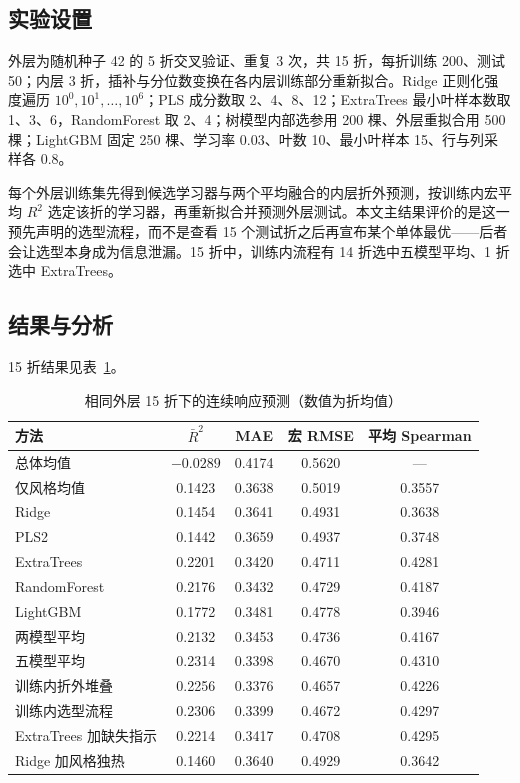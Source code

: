 \documentclass[UTF8,a4paper,zihao=-4]{ctexart}
\numberwithin{figure}{section}
\numberwithin{table}{section}
\numberwithin{equation}{section}
\begin{document}
\subsection{实验设置}

外层为随机种子 42 的 5 折交叉验证、重复 3 次，共 15 折，每折训练 200、测试 50；内层 3 折，插补与分位数变换在各内层训练部分重新拟合。Ridge 正则化强度遍历 $10^{0},10^{1},\dots,10^{6}$；PLS 成分数取 2、4、8、12；ExtraTrees 最小叶样本数取 1、3、6，RandomForest 取 2、4；树模型内部选参用 200 棵、外层重拟合用 500 棵；LightGBM 固定 250 棵、学习率 0.03、叶数 10、最小叶样本 15、行与列采样各 0.8。

每个外层训练集先得到候选学习器与两个平均融合的内层折外预测，按训练内宏平均 $R^2$ 选定该折的学习器，再重新拟合并预测外层测试。本文主结果评价的是这一预先声明的选型流程，而不是查看 15 个测试折之后再宣布某个单体最优——后者会让选型本身成为信息泄漏。15 折中，训练内流程有 14 折选中五模型平均、1 折选中 ExtraTrees。

\subsection{结果与分析}

15 折结果见表~\ref{tab:q1-results}。

\begin{table}[H]
  \centering
  \caption{相同外层 15 折下的连续响应预测（数值为折均值）}
  \label{tab:q1-results}
  \small
  \begin{tabularx}{\textwidth}{@{}>{\raggedright\arraybackslash}X c c c c@{}}
    \toprule
    方法 & $\bar R^{2}$ & MAE & 宏 RMSE & 平均 Spearman \\
    \midrule
    总体均值 & $-0.0289$ & 0.4174 & 0.5620 & — \\
    仅风格均值 & 0.1423 & 0.3638 & 0.5019 & 0.3557 \\
    Ridge & 0.1454 & 0.3641 & 0.4931 & 0.3638 \\
    PLS2 & 0.1442 & 0.3659 & 0.4937 & 0.3748 \\
    ExtraTrees & 0.2201 & 0.3420 & 0.4711 & 0.4281 \\
    RandomForest & 0.2176 & 0.3432 & 0.4729 & 0.4187 \\
    LightGBM & 0.1772 & 0.3481 & 0.4778 & 0.3946 \\
    两模型平均 & 0.2132 & 0.3453 & 0.4736 & 0.4167 \\
    五模型平均 & 0.2314 & 0.3398 & 0.4670 & 0.4310 \\
    训练内折外堆叠 & 0.2256 & 0.3376 & 0.4657 & 0.4226 \\
    训练内选型流程 & 0.2306 & 0.3399 & 0.4672 & 0.4297 \\
    ExtraTrees 加缺失指示 & 0.2214 & 0.3417 & 0.4708 & 0.4295 \\
    Ridge 加风格独热 & 0.1460 & 0.3640 & 0.4929 & 0.3642 \\
    \bottomrule
  \end{tabularx}
\end{table}
\end{document}
